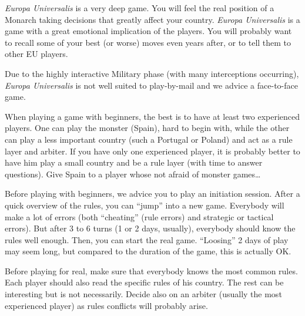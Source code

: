 \emph{Europa Universalis} is a very deep game. You will feel the real position
of a Monarch taking decisions that greatly affect your country. \emph{Europa
  Universalis} is a game with a great emotional implication of the
players. You will probably want to recall some of your best (or worse) moves
even years after, or to tell them to other EU players.

\begin{playtip}
  Due to the highly interactive Military phase (with many interceptions
  occurring), \emph{Europa Universalis} is not well suited to play-by-mail and
  we advice a face-to-face game.

  When playing a game with beginners, the best is to have at least two
  experienced players. One can play the monster (Spain), hard to begin with,
  while the other can play a less important country (such a Portugal or
  Poland) and act as a rule layer and arbiter. If you have only one
  experienced player, it is probably better to have him play a small country
  and be a rule layer (with time to answer questions). Give Spain to a player
  whose not afraid of monster games\ldots

  Before playing with beginners, we advice you to play an initiation
  session. After a quick overview of the rules, you can ``jump'' into a new
  game. Everybody will make a lot of errors (both ``cheating'' (rule errors)
  and strategic or tactical errors). But after 3 to 6 turns (1 or 2 days,
  usually), everybody should know the rules well enough. Then, you can start
  the real game. ``Loosing'' 2 days of play may seem long, but compared to the
  duration of the game, this is actually OK.

  Before playing for real, make sure that everybody knows the most common
  rules. Each player should also read the specific rules of his country. The
  rest can be interesting but is not necessarily. Decide also on an arbiter
  (usually the most experienced player) as rules conflicts will probably
  arise.
\end{playtip}









